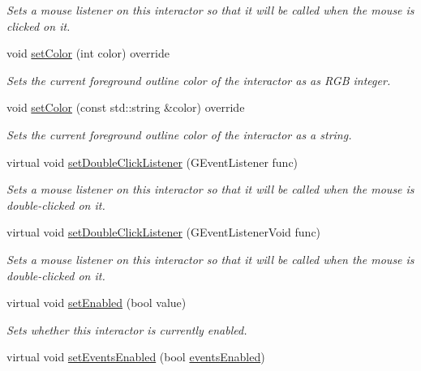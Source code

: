 \begin{DoxyCompactItemize}
\begin{DoxyCompactList}\small\item\em Sets a mouse listener on this interactor so that it will be called when the mouse is clicked on it. \end{DoxyCompactList}\item 
void \mbox{\hyperlink{classGCanvas_af6e1bcf23a09a0ae0607daff81ee45fa}{set\+Color}} (int color) override
\begin{DoxyCompactList}\small\item\em Sets the current foreground outline color of the interactor as as R\+GB integer. \end{DoxyCompactList}\item 
void \mbox{\hyperlink{classGCanvas_a56845b1accc47aa881d05939eef6996c}{set\+Color}} (const std\+::string \&color) override
\begin{DoxyCompactList}\small\item\em Sets the current foreground outline color of the interactor as a string. \end{DoxyCompactList}\item 
virtual void \mbox{\hyperlink{classGInteractor_ac29f9a3462458e165fae3a1f046ee77a}{set\+Double\+Click\+Listener}} (G\+Event\+Listener func)
\begin{DoxyCompactList}\small\item\em Sets a mouse listener on this interactor so that it will be called when the mouse is double-\/clicked on it. \end{DoxyCompactList}\item 
virtual void \mbox{\hyperlink{classGInteractor_a50096194d66f48c92dd4c512d41bfc76}{set\+Double\+Click\+Listener}} (G\+Event\+Listener\+Void func)
\begin{DoxyCompactList}\small\item\em Sets a mouse listener on this interactor so that it will be called when the mouse is double-\/clicked on it. \end{DoxyCompactList}\item 
virtual void \mbox{\hyperlink{classGInteractor_ab831367dd84bbd579e02e55bacb21343}{set\+Enabled}} (bool value)
\begin{DoxyCompactList}\small\item\em Sets whether this interactor is currently enabled. \end{DoxyCompactList}\item 
virtual void \mbox{\hyperlink{classGObservable_afaa30b2a9e0f378fd1c70d2f1d0b8216}{set\+Events\+Enabled}} (bool \mbox{\hyperlink{classGInteractor_a597a370b592e3737d38d9d2f4e2031ea}{events\+Enabled}})

\end{DoxyCompactItemize}

